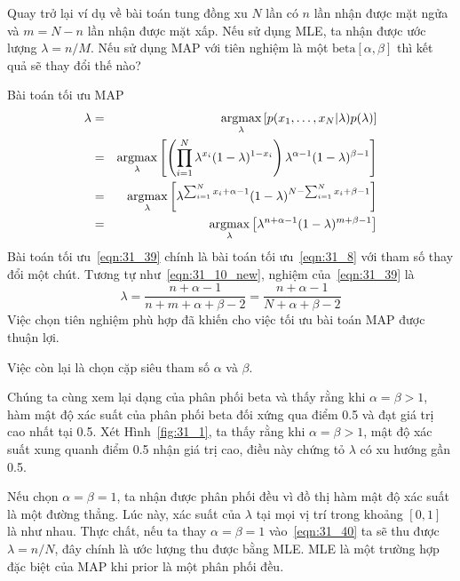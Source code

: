 Quay trở lại ví dụ về bài toán tung đồng xu $N$ lần có $n$ lần nhận được mặt
ngửa và $m = N - n$ lần nhận được mặt xấp. Nếu sử dụng MLE,
ta nhận được ước lượng $\lambda = n/M$. Nếu sử dụng MAP với tiên nghiệm là một
$\text{beta}[\alpha, \beta]$ thì kết quả sẽ thay đổi thế nào?

Bài toán tối ưu MAP
\begin{eqnarray}
\nonumber
\lambda & = & \operatorname*{argmax}_{\lambda} \left[p(x_1, \dots, x_N | \lambda) p(\lambda) \right] \\\
\nonumber
& = & \operatorname*{argmax}_{\lambda} \left[\left(\prod_{i=1}^N \lambda^{x_i} ( 1- \lambda)^{1 - x_i}\right) \lambda^{\alpha - 1} ( 1 - \lambda)^{\beta - 1} \right] \\\
\nonumber
& = & \operatorname*{argmax}_{\lambda} \left[ \lambda^{\sum_{i = 1}^N x_i + \alpha - 1} ( 1- \lambda)^{N - \sum_{i=1}^N x_i + \beta - 1} \right] \\\
\label{eqn:31_39}
& = & \operatorname*{argmax}_{\lambda} \left[ \lambda^{n + \alpha - 1} ( 1- \lambda)^{m + \beta - 1} \right]
\end{eqnarray}
Bài toán tối ưu~\eqref{eqn:31_39} chính là bài toán tối ưu~\eqref{eqn:31_8} với
tham số thay đổi một chút. Tương tự như~\eqref{eqn:31_10_new}, nghiệm
của~\eqref{eqn:31_39} là
\begin{equation}
\label{eqn:31_40}
\lambda = \frac{n + \alpha - 1}{n + m + \alpha + \beta - 2}= \frac{n + \alpha - 1}{N + \alpha + \beta - 2}
\end{equation}
Việc chọn tiên nghiệm phù hợp đã khiến cho việc tối ưu bài toán MAP được thuận
lợi.


Việc còn lại là chọn cặp siêu tham số $\alpha$ và $\beta$.

Chúng ta cùng xem lại dạng của phân phối beta và thấy rằng khi $\alpha
= \beta > 1$, hàm mật độ xác suất của phân phối beta đối xứng qua điểm 0.5 và
đạt giá trị cao nhất tại 0.5. Xét Hình~\ref{fig:31_1}, ta thấy rằng khi
$\alpha =\beta > 1$, mật độ xác suất xung quanh điểm 0.5 nhận giá trị
cao, điều này chứng tỏ $\lambda$ có xu hướng gần 0.5.

Nếu chọn $\alpha = \beta = 1$, ta nhận được phân phối đều vì đồ thị hàm mật
độ xác suất là một đường thẳng. Lúc này, xác suất của $\lambda$ tại mọi vị trí
trong khoảng $[0, 1]$ là như nhau. Thực chất, nếu ta thay $\alpha = \beta = 1$
vào~\eqref{eqn:31_40} ta sẽ thu được $\lambda = n/N$, đây chính là ước lượng thu
được bằng MLE. MLE là một trường hợp đặc biệt của MAP khi prior là một phân phối
đều.

